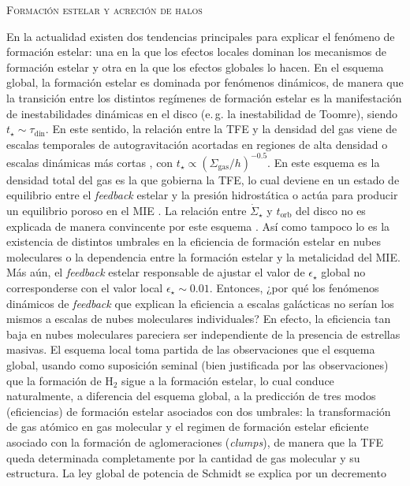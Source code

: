 \documentclass[xcolor=dvipsnames,4pt,hyperref={colorlinks,citecolor=black,linkcolor=black,urlcolor=black}]{beamer}
\begin{document}
\begin{frame}[allowframebreaks]{\textsc{Formación estelar y acreción de halos}}
\begin{description}
En la actualidad existen dos tendencias principales para explicar el fenómeno de formación estelar:
una en la que los efectos locales dominan los mecanismos de formación estelar y otra en la que los
efectos globales lo hacen. En el esquema global, la formación estelar es dominada por fenómenos
dinámicos, de manera que la transición entre los distintos regímenes de formación estelar es la
manifestación de inestabilidades dinámicas en el disco (e.\,g. la inestabilidad de Toomre), siendo
$t_\star\sim\tau_\text{din}$. En este sentido, la relación entre la TFE y la densidad del gas viene
de escalas temporales de autogravitación acortadas en regiones de alta densidad o escalas dinámicas
más cortas \citep[e.\,g.][]{Ostriker2010}, con $t_\star\propto(\Sigma_\text{gas}/h)^{-0.5}$. En este
esquema es la densidad total del gas es la que gobierna la TFE, lo cual deviene en un estado de
equilibrio entre el \emph{feedback} estelar y la presión hidrostática o actúa para producir un
equilibrio poroso en el MIE \citep{Kennicutt2012}. La relación entre $\dot{\Sigma}_\star$ y
$t_\text{orb}$ del disco no es explicada de manera convincente por este esquema
\citep{Kennicutt1998b}. Así como tampoco lo es la existencia de distintos umbrales en la eficiencia
de formación estelar en nubes moleculares o la dependencia entre la formación estelar y la
metalicidad del MIE.
Más aún, el \emph{feedback} estelar responsable de ajustar el valor de $\epsilon_\star$ global no
corresponderse con el valor local $\epsilon_\star\sim0.01$. Entonces, ¿por qué los fenómenos
dinámicos de \emph{feedback} que explican la eficiencia a escalas galácticas no serían los mismos a
escalas de nubes moleculares individuales? En efecto, la eficiencia tan baja en nubes moleculares
pareciera ser independiente de la presencia de estrellas masivas.
El esquema local toma partida de las observaciones que el esquema global, usando como suposición
seminal (bien justificada por las observaciones) que la formación de H$_2$ sigue a la formación
estelar, lo cual conduce naturalmente, a diferencia del esquema global, a la predicción de tres
modos (eficiencias) de formación estelar asociados con dos umbrales: la transformación de gas
atómico en gas molecular y el regimen de formación estelar eficiente asociado con la formación de
aglomeraciones (\emph{clumps}), de manera que la TFE queda determinada completamente por la cantidad
de gas molecular y su estructura. La ley global de potencia de Schmidt se explica por un decremento

\end{description}
\end{frame}
\end{document}
